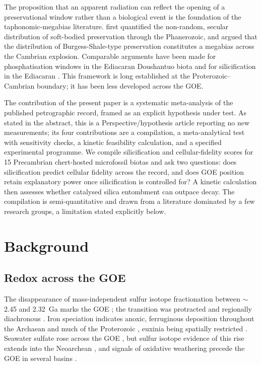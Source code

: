 \documentclass[11pt]{article}
\begin{document}
The proposition that an apparent radiation can reflect the opening of a preservational window rather
than a biological event is the foundation of the taphonomic-megabias literature. \citet{Allison1993}
first quantified the non-random, secular distribution of soft-bodied preservation through the
Phanerozoic, and \citet{Butterfield2003} argued that the distribution of Burgess-Shale-type
preservation constitutes a megabias across the Cambrian explosion. Comparable arguments have been
made for phosphatisation windows in the Ediacaran Doushantuo biota and for silicification in the
Ediacaran \citep{Tarhan2016}. This framework is long established at the Proterozoic--Cambrian
boundary; it has been less developed across the GOE.

The contribution of the present paper is a systematic meta-analysis of the published petrographic
record, framed as an explicit hypothesis under test. As stated in the abstract, this is a
Perspective/hypothesis article reporting no new measurements; its four contributions are a
compilation, a meta-analytical test with sensitivity checks, a kinetic feasibility calculation, and a
specified experimental programme. We compile silicification and cellular-fidelity scores for 15
Precambrian chert-hosted microfossil biotas and ask two questions: does silicification predict
cellular fidelity across the record, and does GOE position retain explanatory power once
silicification is controlled for? A kinetic calculation then assesses whether catalysed silica
entombment can outpace decay. The compilation is semi-quantitative and drawn from a literature
dominated by a few research groups, a limitation stated explicitly below.

\section{Background}

\subsection{Redox across the GOE}

The disappearance of mass-independent sulfur isotope fractionation between $\sim$2.45 and 2.32~Ga
marks the GOE \citep{Holland2006,Bekker2004,Pavlov2002,Farquhar2000}; the transition was protracted
and regionally diachronous \citep{Lyons2014,Philippot2018}. Iron speciation indicates anoxic,
ferruginous deposition throughout the Archaean and much of the Proterozoic
\citep{Canfield1998,Poulton2005,Poulton2011}, euxinia being spatially restricted
\citep{Reinhard2009}. Seawater sulfate rose across the GOE \citep{Habicht2002,Kah2004,Crowe2014},
but sulfur isotope evidence of this rise extends into the Neoarchean \citep{Reinhard2009}, and
signals of oxidative weathering precede the GOE in several basins \citep{Anbar2007}.
\end{document}
